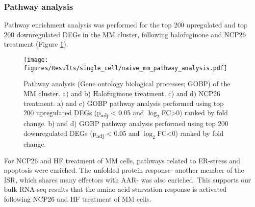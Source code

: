 \subsubsection{Pathway analysis}
Pathway enrichment analysis was performed for the top 200 upregulated and top 200 downregulated DEGs in the MM cluster, following halofuginone and NCP26 treatment (Figure \ref{fig:naive_mm_pathway_analysis}).
\begin{figure}[htb]
\centering
\texttt{[image: figures/Results/single\_cell/naive\_mm\_pathway\_analysis.pdf]}
\caption[MM cluster pathway analysis- newly-diagnosed MM]{Pathway analysis (Gene ontology biological processes; GOBP) of the MM cluster.
    a) and b) Halofuginone treatment.
    c) and d) NCP26 treatment.
a) and c) GOBP pathway analysis performed using top 200 upregulated DEGs (p\textsubscript{adj} < 0.05 and $\log_{2}$FC>0) ranked by fold change.
b) and d) GOBP pathway analysis performed using top 200 downregulated DEGs (p\textsubscript{adj} < 0.05 and $\log_{2}$FC<0) ranked by fold change.}
\label{fig:naive_mm_pathway_analysis}
\end{figure}

For NCP26 and HF treatment of MM cells, pathways related to ER-stress and apoptosis were enriched.
The unfolded protein response- another member of the ISR, which shares many effectors with AAR- was also enriched.
This supports our bulk RNA-seq results that the amino acid starvation response is activated following NCP26 and HF treatment of MM cells.

